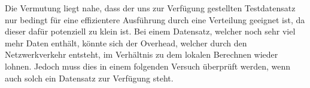 Die Vermutung liegt nahe, dass der uns zur Verfügung gestellten Testdatensatz nur bedingt für eine effizientere Ausführung durch eine Verteilung geeignet ist, da dieser dafür potenziell zu klein ist. Bei einem Datensatz, welcher noch sehr viel mehr Daten enthält, könnte sich der Overhead, welcher durch den Netzwerkverkehr entsteht, im Verhältnis zu dem lokalen Berechnen wieder lohnen. Jedoch muss dies in einem folgenden Versuch überprüft werden, wenn auch solch ein Datensatz zur Verfügung steht.